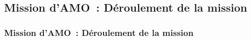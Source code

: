 \subsection{Mission d'AMO~: Déroulement de la mission}
\begin{frame}
	\frametitle{Mission d'AMO~: Déroulement de la mission}
\end{frame}

